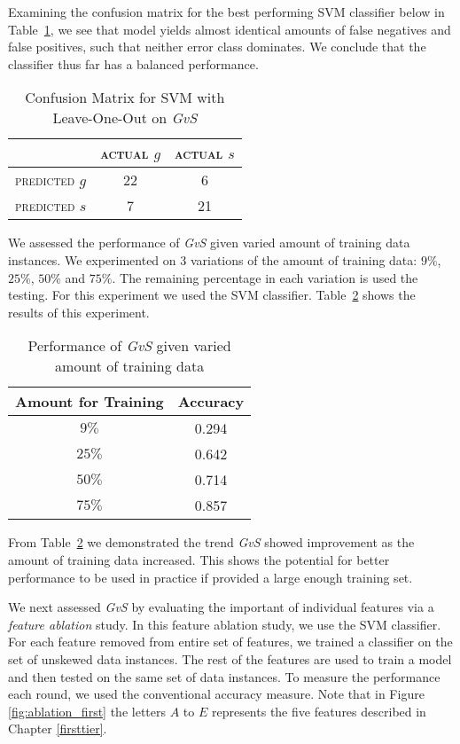 Examining the confusion matrix for the best performing SVM classifier below in Table~\ref{tab:firstsvmconfusionmatrix}, we see that model yields almost identical amounts of false negatives and false positives, such that neither error class dominates.  We conclude that the classifier thus far has a balanced performance.

\begin{table}[h]
	\center
	\begin{tabular}{ c | c  c }
		 & \textsc{actual $g$} & \textsc{actual $s$} \\
		\hline
		\textsc{predicted $g$} 	& 22 & 6 \\
		\textsc{predicted $s$}		& 7 & 21
	\end{tabular}
	\caption{Confusion Matrix for SVM with Leave-One-Out on {\it GvS}}
	\label{tab:firstsvmconfusionmatrix}
\end{table}

We assessed the performance of \textit{GvS} given varied amount of training data instances. We experimented on 3 variations of the amount of training data: $9\%$, $25\%$, $50\%$ and $75\%$. The remaining percentage in each variation is used the testing. For this experiment we used the SVM classifier. Table~\ref{tab:variationtesting} shows the results of this experiment.

\begin{table}[h]
\centering
\begin{tabular}{ c c}
	Amount for Training & Accuracy \\
	\hline
	$9\%$ & 0.294 \\
	$25\%$ & 0.642 \\
	$50\%$ & 0.714 \\
	$75\%$ & 0.857 \\
\end{tabular}
\caption{Performance of {\it GvS} given varied amount of training data}
\label{tab:variationtesting}
\end{table}
From Table~\ref{tab:variationtesting} we demonstrated the trend \textit{GvS} showed improvement as the amount of training data increased. This shows the potential for better performance to be used in practice if provided a large enough training set.

We next assessed {\it GvS} by evaluating the important of individual features via a {\it feature ablation} study. In this feature ablation study, we use the SVM classifier. For each feature removed from entire set of features, we trained a classifier on the set of unskewed data instances. The rest of the features are used to train a model and then tested on the same set of data instances. To measure the performance each round, we used the conventional accuracy measure. Note that in Figure \ref{fig:ablation_first} the letters $A$ to $E$ represents the five features described in Chapter \ref{firsttier}.

